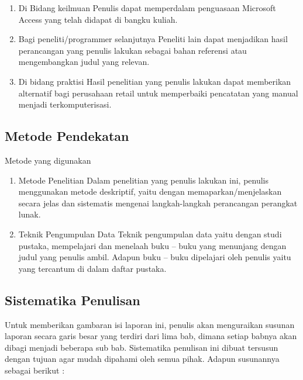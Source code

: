 \documentclass{article}
\begin{document}
\begin{enumerate}
    \item Di Bidang keilmuan \newline
    Penulis dapat memperdalam penguasaan Microsoft Access yang telah didapat di bangku kuliah.
   
    \item Bagi peneliti/programmer selanjutnya \newline
    Peneliti lain dapat menjadikan hasil perancangan yang penulis lakukan sebagai bahan referensi atau mengembangkan judul yang relevan.
    
    \item Di bidang praktisi \newline
    Hasil penelitian yang penulis lakukan dapat memberikan alternatif bagi perusahaan retail untuk memperbaiki pencatatan yang manual menjadi terkomputerisasi.
\end{enumerate}

\subsection{Metode Pendekatan}
Metode yang digunakan

\begin{enumerate}
    \item Metode Penelitian \newline
    Dalam penelitian yang penulis lakukan ini, penulis menggunakan metode deskriptif, yaitu dengan memaparkan/menjelaskan secara jelas dan sistematis mengenai langkah-langkah perancangan perangkat lunak.
    \item Teknik Pengumpulan Data \newline
    Teknik pengumpulan data yaitu dengan studi pustaka, mempelajari dan menelaah buku – buku yang menunjang dengan judul yang penulis ambil. Adapun buku – buku dipelajari oleh penulis yaitu yang tercantum di dalam daftar pustaka.
\end{enumerate}
\subsection{Sistematika Penulisan}
Untuk memberikan gambaran isi laporan ini, penulis akan menguraikan susunan laporan secara garis besar yang terdiri dari lima bab, dimana setiap babnya akan dibagi menjadi beberapa sub bab. Sistematika penulisan ini dibuat tersusun dengan tujuan agar mudah dipahami oleh semua pihak. Adapun susunannya sebagai berikut :
\end{document}
